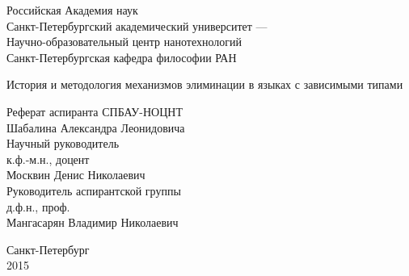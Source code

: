 \begin{titlepage}

\begin{center}
Российская Академия наук\\
Санкт-Петербургский академический университет ---\\
Научно-образовательный центр нанотехнологий\\[.5cm]
Санкт-Петербургская кафедра философии РАН
\end{center}

\vspace{2cm}

\begin{center}
\Large
История и методология механизмов элиминации в языках с зависимыми типами
\end{center}

\vspace{1cm}

\begin{flushright}
Реферат аспиранта СПБАУ-НОЦНТ\\
Шабалина Александра Леонидовича\\[.5cm]

Научный руководитель\\
к.ф.-м.н., доцент\\
Москвин Денис Николаевич\\[.5cm]

Руководитель аспирантской группы\\
д.ф.н., проф.\\
Мангасарян Владимир Николаевич
\end{flushright}

\vfill

\begin{center}
Санкт-Петербург\\
2015
\end{center}

\end{titlepage}
